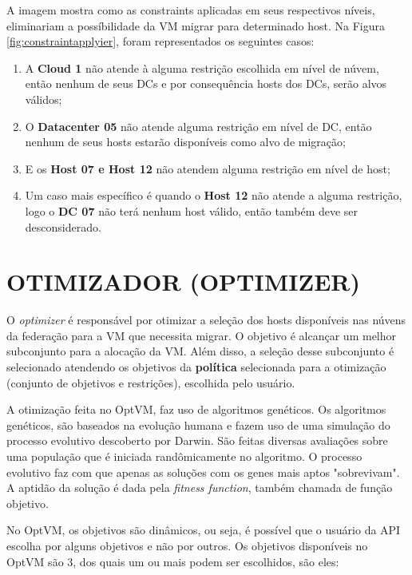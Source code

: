 A imagem mostra como as constraints aplicadas em seus respectivos níveis, eliminariam a possíbilidade
da VM migrar para determinado host. Na Figura \ref{fig:constraintapplyier}, foram representados os seguintes casos:

\begin{enumerate}
\item A \textbf{Cloud 1} não atende à alguma restrição escolhida em nível de núvem, então nenhum de seus DCs e por consequência hosts dos DCs, serão alvos válidos;
\item O \textbf{Datacenter 05} não atende alguma restrição em nível de DC, então nenhum de seus hosts estarão disponíveis como alvo de migração;
\item E os \textbf{Host 07 e Host 12} não atendem alguma restrição em nível de host;
\item Um caso mais específico é quando o \textbf{Host 12} não atende a alguma restrição, logo o \textbf{DC 07} não terá nenhum host válido, então também deve ser desconsiderado.
\end{enumerate}

\clearpage

\section{OTIMIZADOR (OPTIMIZER)}

O \textit{optimizer} é responsável por otimizar a seleção dos hosts disponíveis nas núvens da federação
para a VM que necessita migrar. O objetivo é alcançar um melhor subconjunto para a alocação da VM. 
Além disso, a seleção desse subconjunto é selecionado atendendo os objetivos da \textbf{política} 
selecionada para a otimização (conjunto de objetivos e restrições), escolhida pelo usuário.

A otimização feita no OptVM, faz uso de algoritmos genéticos. Os algoritmos genéticos,
são baseados na evolução humana e fazem uso de uma simulação do processo evolutivo descoberto por Darwin.
São feitas diversas avaliações sobre uma população que é iniciada randômicamente no algoritmo. O processo
evolutivo faz com que apenas as soluções com os genes mais aptos "sobrevivam". A aptidão da solução
é dada pela \textit{fitness function}, também chamada de função objetivo.

No OptVM, os objetivos são dinâmicos, ou seja, é possível que o usuário da API escolha por alguns
objetivos e não por outros. Os objetivos disponíveis no OptVM são 3, dos quais um ou mais podem ser 
escolhidos, são eles:

